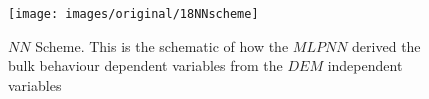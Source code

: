 \begin{figure}[!htb] 
\centering 
\texttt{[image: images/original/18NNscheme]} 
\caption[NN Scheme]{$NN$ Scheme. This is the schematic of how the $MLPNN$
derived the bulk behaviour dependent variables from the $DEM$ independent variables}
\label{fig:18NNscheme} 
\end{figure}


